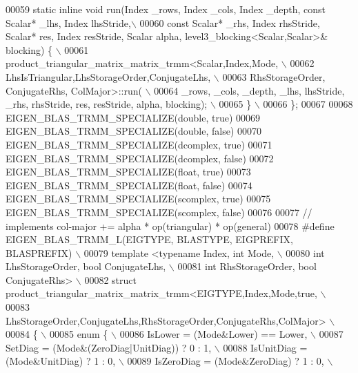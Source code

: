 \begin{DoxyCode}
00059 \textcolor{preprocessor}{  static inline void run(Index \_rows, Index \_cols, Index \_depth, const Scalar* \_lhs, Index lhsStride,\(\backslash\)}
00060 \textcolor{preprocessor}{    const Scalar* \_rhs, Index rhsStride, Scalar* res, Index resStride, Scalar alpha,
       level3\_blocking<Scalar,Scalar>& blocking) \{ \(\backslash\)}
00061 \textcolor{preprocessor}{      product\_triangular\_matrix\_matrix\_trmm<Scalar,Index,Mode, \(\backslash\)}
00062 \textcolor{preprocessor}{        LhsIsTriangular,LhsStorageOrder,ConjugateLhs, \(\backslash\)}
00063 \textcolor{preprocessor}{        RhsStorageOrder, ConjugateRhs, ColMajor>::run( \(\backslash\)}
00064 \textcolor{preprocessor}{        \_rows, \_cols, \_depth, \_lhs, lhsStride, \_rhs, rhsStride, res, resStride, alpha, blocking); \(\backslash\)}
00065 \textcolor{preprocessor}{  \} \(\backslash\)}
00066 \textcolor{preprocessor}{\};}
00067 
00068 EIGEN\_BLAS\_TRMM\_SPECIALIZE(\textcolor{keywordtype}{double}, \textcolor{keyword}{true})
00069 EIGEN\_BLAS\_TRMM\_SPECIALIZE(\textcolor{keywordtype}{double}, false)
00070 EIGEN\_BLAS\_TRMM\_SPECIALIZE(dcomplex, true)
00071 EIGEN\_BLAS\_TRMM\_SPECIALIZE(dcomplex, false)
00072 EIGEN\_BLAS\_TRMM\_SPECIALIZE(\textcolor{keywordtype}{float}, true)
00073 EIGEN\_BLAS\_TRMM\_SPECIALIZE(\textcolor{keywordtype}{float}, false)
00074 EIGEN\_BLAS\_TRMM\_SPECIALIZE(scomplex, true)
00075 EIGEN\_BLAS\_TRMM\_SPECIALIZE(scomplex, false)
00076 
00077 \textcolor{comment}{// implements col-major += alpha * op(triangular) * op(general)}
00078 \textcolor{preprocessor}{#define EIGEN\_BLAS\_TRMM\_L(EIGTYPE, BLASTYPE, EIGPREFIX, BLASPREFIX) \(\backslash\)}
00079 \textcolor{preprocessor}{template <typename Index, int Mode, \(\backslash\)}
00080 \textcolor{preprocessor}{          int LhsStorageOrder, bool ConjugateLhs, \(\backslash\)}
00081 \textcolor{preprocessor}{          int RhsStorageOrder, bool ConjugateRhs> \(\backslash\)}
00082 \textcolor{preprocessor}{struct product\_triangular\_matrix\_matrix\_trmm<EIGTYPE,Index,Mode,true, \(\backslash\)}
00083 \textcolor{preprocessor}{         LhsStorageOrder,ConjugateLhs,RhsStorageOrder,ConjugateRhs,ColMajor> \(\backslash\)}
00084 \textcolor{preprocessor}{\{ \(\backslash\)}
00085 \textcolor{preprocessor}{  enum \{ \(\backslash\)}
00086 \textcolor{preprocessor}{    IsLower = (Mode&Lower) == Lower, \(\backslash\)}
00087 \textcolor{preprocessor}{    SetDiag = (Mode&(ZeroDiag|UnitDiag)) ? 0 : 1, \(\backslash\)}
00088 \textcolor{preprocessor}{    IsUnitDiag  = (Mode&UnitDiag) ? 1 : 0, \(\backslash\)}
00089 \textcolor{preprocessor}{    IsZeroDiag  = (Mode&ZeroDiag) ? 1 : 0, \(\backslash\)}

\end{DoxyCode}
